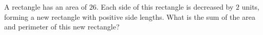 A rectangle has an area of $26$. Each side of this rectangle is decreased by $2$ units, forming a new rectangle with positive side lengths. What is the sum of the area and perimeter of this new rectangle?

